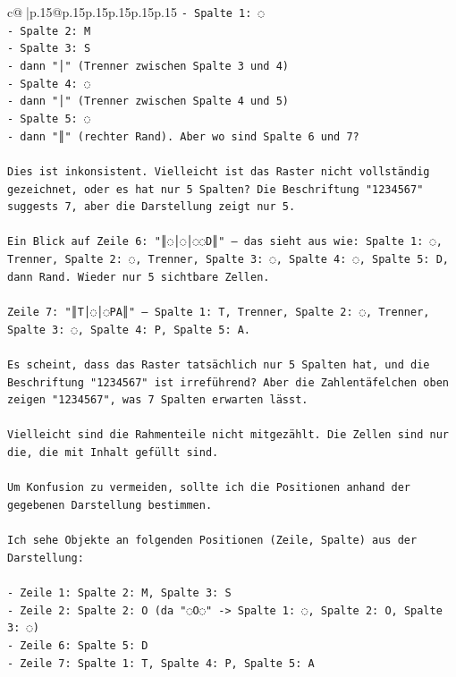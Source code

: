\documentclass{article}
\begin{document}
{\begin{supertabular}{c@{$\;$}|p{.15\linewidth}@{}p{.15\linewidth}p{.15\linewidth}p{.15\linewidth}p{.15\linewidth}p{.15\linewidth}}
{{{\texttt{{-} Spalte 1: ◌} \\
\texttt{{-} Spalte 2: M} \\
\texttt{{-} Spalte 3: S} \\
\texttt{{-} dann "│" (Trenner zwischen Spalte 3 und 4)} \\
\texttt{{-} Spalte 4: ◌} \\
\texttt{{-} dann "│" (Trenner zwischen Spalte 4 und 5)} \\
\texttt{{-} Spalte 5: ◌} \\
\texttt{{-} dann "║" (rechter Rand). Aber wo sind Spalte 6 und 7?} \\
\\ 
\texttt{Dies ist inkonsistent. Vielleicht ist das Raster nicht vollständig gezeichnet, oder es hat nur 5 Spalten? Die Beschriftung "1234567" suggests 7, aber die Darstellung zeigt nur 5.} \\
\\ 
\texttt{Ein Blick auf Zeile 6: "║◌│◌│◌◌D║" – das sieht aus wie: Spalte 1: ◌, Trenner, Spalte 2: ◌, Trenner, Spalte 3: ◌, Spalte 4: ◌, Spalte 5: D, dann Rand. Wieder nur 5 sichtbare Zellen.} \\
\\ 
\texttt{Zeile 7: "║T│◌│◌PA║" – Spalte 1: T, Trenner, Spalte 2: ◌, Trenner, Spalte 3: ◌, Spalte 4: P, Spalte 5: A.} \\
\\ 
\texttt{Es scheint, dass das Raster tatsächlich nur 5 Spalten hat, und die Beschriftung "1234567" ist irreführend? Aber die Zahlentäfelchen oben zeigen "1234567", was 7 Spalten erwarten lässt.} \\
\\ 
\texttt{Vielleicht sind die Rahmenteile nicht mitgezählt. Die Zellen sind nur die, die mit Inhalt gefüllt sind.} \\
\\ 
\texttt{Um Konfusion zu vermeiden, sollte ich die Positionen anhand der gegebenen Darstellung bestimmen.} \\
\\ 
\texttt{Ich sehe Objekte an folgenden Positionen (Zeile, Spalte) aus der Darstellung:} \\
\\ 
\texttt{{-} Zeile 1: Spalte 2: M, Spalte 3: S} \\
\texttt{{-} Zeile 2: Spalte 2: O (da "◌O◌" {-}> Spalte 1: ◌, Spalte 2: O, Spalte 3: ◌)} \\
\texttt{{-} Zeile 6: Spalte 5: D} \\
\texttt{{-} Zeile 7: Spalte 1: T, Spalte 4: P, Spalte 5: A} \\
}}}
\end{supertabular}}
\end{document}
